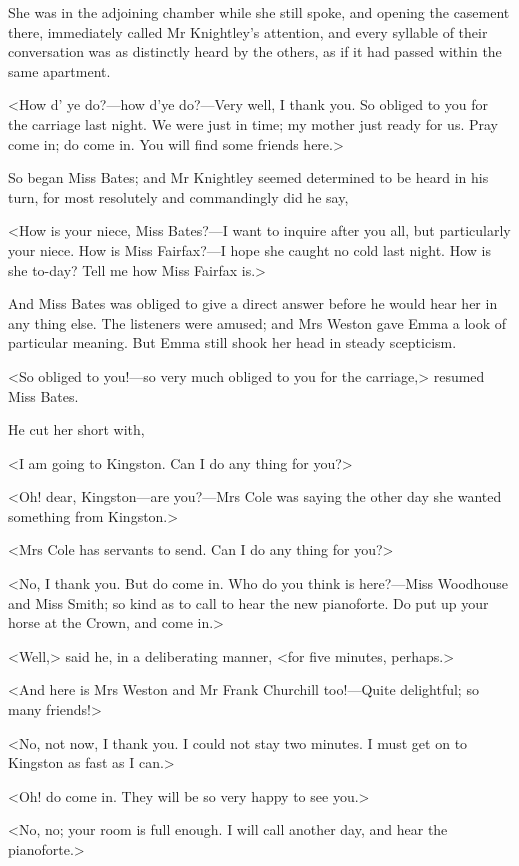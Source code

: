 She was in the adjoining chamber while she still spoke, and opening the casement there, immediately called Mr Knightley's attention, and every syllable of their conversation was as distinctly heard by the others, as if it had passed within the same apartment.

<How d' ye do?—how d'ye do?—Very well, I thank you. So obliged to you for the carriage last night. We were just in time; my mother just ready for us. Pray come in; do come in. You will find some friends here.>

So began Miss Bates; and Mr Knightley seemed determined to be heard in his turn, for most resolutely and commandingly did he say,

<How is your niece, Miss Bates?—I want to inquire after you all, but particularly your niece. How is Miss Fairfax?—I hope she caught no cold last night. How is she to-day? Tell me how Miss Fairfax is.>

And Miss Bates was obliged to give a direct answer before he would hear her in any thing else. The listeners were amused; and Mrs Weston gave Emma a look of particular meaning. But Emma still shook her head in steady scepticism.

<So obliged to you!—so very much obliged to you for the carriage,> resumed Miss Bates.

He cut her short with,

<I am going to Kingston. Can I do any thing for you?>

<Oh! dear, Kingston—are you?—Mrs Cole was saying the other day she wanted something from Kingston.>

<Mrs Cole has servants to send. Can I do any thing for you?>

<No, I thank you. But do come in. Who do you think is here?—Miss Woodhouse and Miss Smith; so kind as to call to hear the new pianoforte. Do put up your horse at the Crown, and come in.>

<Well,> said he, in a deliberating manner, <for five minutes, perhaps.>

<And here is Mrs Weston and Mr Frank Churchill too!—Quite delightful; so many friends!>

<No, not now, I thank you. I could not stay two minutes. I must get on to Kingston as fast as I can.>

<Oh! do come in. They will be so very happy to see you.>

<No, no; your room is full enough. I will call another day, and hear the pianoforte.>


